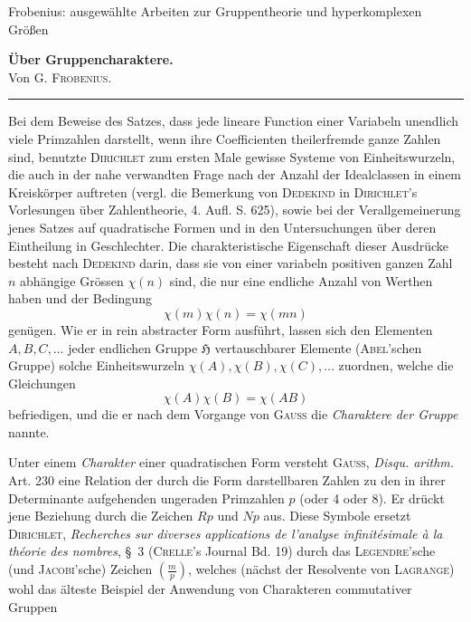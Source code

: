 \documentclass[11pt]{article}
\newcommand{\grp}{\mathfrak{H}}
\begin{document}
\begin{center}{\huge Frobenius: ausgewählte Arbeiten zur Gruppentheorie und hyperkomplexen Größen}\end{center}
\bigskip

\begin{center}
{\Large \textbf{Über Gruppencharaktere.}}\\[0.8em]
{\large Von G. \textsc{Frobenius}.}\\[0.6em]
\rule{6em}{0.4pt}
\end{center}

Bei dem Beweise des Satzes, dass jede lineare Function einer Variabeln unendlich viele Primzahlen darstellt, wenn ihre Coefficienten theilerfremde ganze Zahlen sind, benutzte \textsc{Dirichlet} zum ersten Male gewisse Systeme von Einheitswurzeln, die auch in der nahe verwandten Frage nach der Anzahl der Idealclassen in einem Kreiskörper auftreten (vergl. die Bemerkung von \textsc{Dedekind} in \textsc{Dirichlet}'s Vorlesungen über Zahlentheorie, 4. Aufl. S. 625), sowie bei der Verallgemeinerung jenes Satzes auf quadratische Formen und in den Untersuchungen über deren Eintheilung in Geschlechter. Die charakteristische Eigenschaft dieser Ausdrücke besteht nach \textsc{Dedekind} darin, dass sie von einer variabeln positiven ganzen Zahl $n$ abhängige Grössen $\chi(n)$ sind, die nur eine endliche Anzahl von Werthen haben und der Bedingung
\[
\chi(m)\chi(n)=\chi(mn)
\]
genügen. Wie er in rein abstracter Form ausführt, lassen sich den Elementen $A,B,C,\ldots$ jeder endlichen Gruppe $\grp$ vertauschbarer Elemente (\textsc{Abel}'schen Gruppe) solche Einheitswurzeln $\chi(A),\chi(B),\chi(C),\ldots$ zuordnen, welche die Gleichungen
\[
\chi(A)\chi(B)=\chi(AB)
\]
befriedigen, und die er nach dem Vorgange von \textsc{Gauss} die \emph{Charaktere der Gruppe} nannte.

Unter einem \emph{Charakter} einer quadratischen Form versteht \textsc{Gauss}, \emph{Disqu. arithm.} Art. 230 eine Relation der durch die Form darstellbaren Zahlen zu den in ihrer Determinante aufgehenden ungeraden Primzahlen $p$ (oder 4 oder 8). Er drückt jene Beziehung durch die Zeichen $Rp$ und $Np$ aus. Diese Symbole ersetzt \textsc{Dirichlet}, \emph{Recherches sur diverses applications de l'analyse infinitésimale à la théorie des nombres}, \S~3 (\textsc{Crelle}'s Journal Bd. 19) durch das \textsc{Legendre}'sche (und \textsc{Jacobi}'sche) Zeichen $\left(\frac{m}{p}\right)$, welches (nächst der Resolvente von \textsc{Lagrange}) wohl das älteste Beispiel der Anwendung von Charakteren commutativer Gruppen
\end{document}
